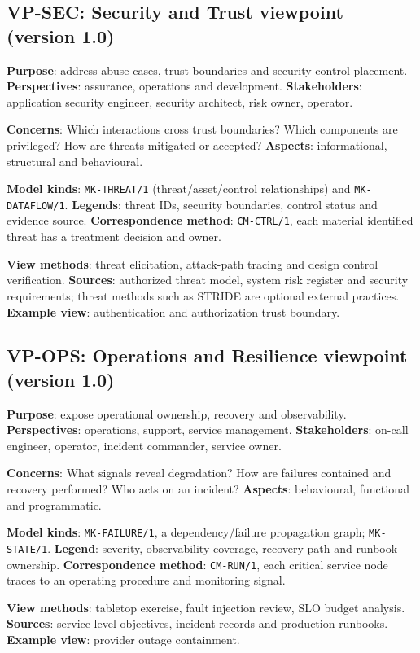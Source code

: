 \documentclass[11pt,letterpaper]{article}
\begin{document}
\subsection{VP-SEC: Security and Trust viewpoint (version 1.0)}
\textbf{Purpose}: address abuse cases, trust boundaries and security control placement. \textbf{Perspectives}: assurance, operations and development. \textbf{Stakeholders}: application security engineer, security architect, risk owner, operator.\par
\textbf{Concerns}: Which interactions cross trust boundaries? Which components are privileged? How are threats mitigated or accepted? \textbf{Aspects}: informational, structural and behavioural.\par
\textbf{Model kinds}: \texttt{MK-THREAT/1} (threat/asset/control relationships) and \texttt{MK-DATAFLOW/1}. \textbf{Legends}: threat IDs, security boundaries, control status and evidence source. \textbf{Correspondence method}: \texttt{CM-CTRL/1}, each material identified threat has a treatment decision and owner.\par
\textbf{View methods}: threat elicitation, attack-path tracing and design control verification. \textbf{Sources}: authorized threat model, system risk register and security requirements; threat methods such as STRIDE are optional external practices. \textbf{Example view}: authentication and authorization trust boundary.\par
\subsection{VP-OPS: Operations and Resilience viewpoint (version 1.0)}
\textbf{Purpose}: expose operational ownership, recovery and observability. \textbf{Perspectives}: operations, support, service management. \textbf{Stakeholders}: on-call engineer, operator, incident commander, service owner.\par
\textbf{Concerns}: What signals reveal degradation? How are failures contained and recovery performed? Who acts on an incident? \textbf{Aspects}: behavioural, functional and programmatic.\par
\textbf{Model kinds}: \texttt{MK-FAILURE/1}, a dependency/failure propagation graph; \texttt{MK-STATE/1}. \textbf{Legend}: severity, observability coverage, recovery path and runbook ownership. \textbf{Correspondence method}: \texttt{CM-RUN/1}, each critical service node traces to an operating procedure and monitoring signal.\par
\textbf{View methods}: tabletop exercise, fault injection review, SLO budget analysis. \textbf{Sources}: service-level objectives, incident records and production runbooks. \textbf{Example view}: provider outage containment.\par
\end{document}
